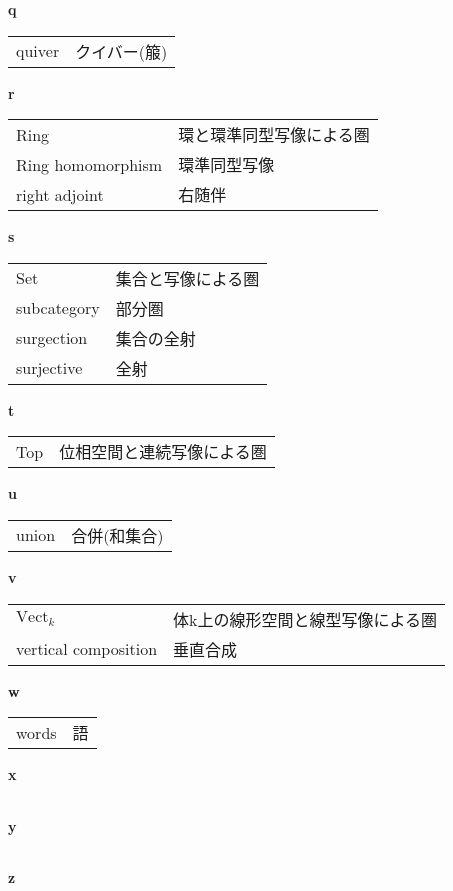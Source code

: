 \documentclass[dvipdfmx]{jsarticle}
\begin{document}
\textbf{q}

  \begin{tabular}{ll}
    quiver & クイバー(箙)
  \end{tabular}

\textbf{r}

  \begin{tabular}{ll}
    Ring & 環と環準同型写像による圏 \\
    Ring homomorphism & 環準同型写像 \\
    right adjoint & 右随伴 \\
  \end{tabular}

\textbf{s}

  \begin{tabular}{ll}
    Set & 集合と写像による圏 \\
    subcategory & 部分圏 \\
    surgection & 集合の全射 \\
    surjective & 全射 \\
  \end{tabular}

\textbf{t}

  \begin{tabular}{ll}
    Top & 位相空間と連続写像による圏 \\
  \end{tabular}

\textbf{u}

  \begin{tabular}{ll}
    union & 合併(和集合) \\
  \end{tabular}

\textbf{v}

  \begin{tabular}{ll}
    $\mathrm{Vect}_k$ & 体k上の線形空間と線型写像による圏 \\
    vertical composition & 垂直合成 \\
  \end{tabular}

\textbf{w}

  \begin{tabular}{ll}
    words & 語 \\
  \end{tabular}

\textbf{x}

  \begin{tabular}{ll}
  \end{tabular}

\textbf{y}

  \begin{tabular}{ll}
  \end{tabular}

\textbf{z}

  \begin{tabular}{ll}
  \end{tabular}
\end{document}
